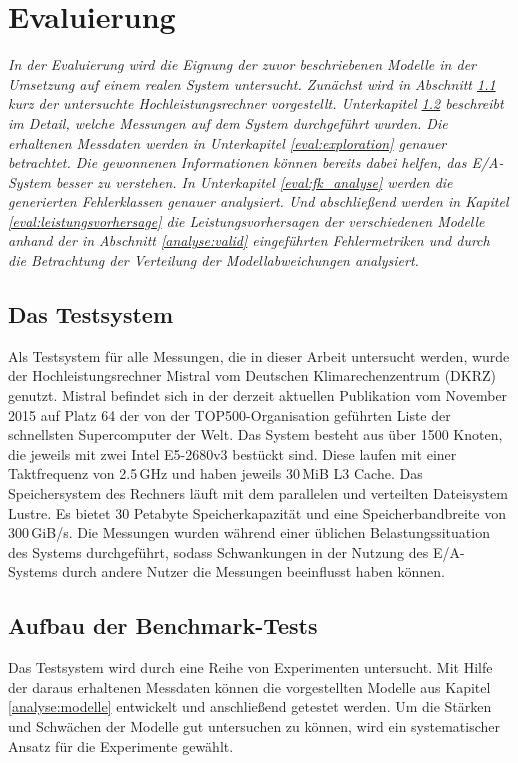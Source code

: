 \documentclass[
	12pt,
	a4paper,
	BCOR10mm,
	DIV14,
	listof=totoc,
	bibliography=totoc,
	headsepline
]{scrreprt}
\begin{document}
\chapter{Evaluierung}
\label{eval}
\textit{%
	In der Evaluierung wird die Eignung der zuvor beschriebenen Modelle in der Umsetzung auf einem realen System untersucht.
	Zunächst wird in Abschnitt \ref{eval:testsystem} kurz der untersuchte Hochleistungsrechner vorgestellt.	
	Unterkapitel \ref{eval:benchmark} beschreibt im Detail, welche Messungen auf dem System durchgeführt wurden.
	Die erhaltenen Messdaten werden in Unterkapitel \ref{eval:exploration} genauer betrachtet. Die gewonnenen Informationen können bereits dabei helfen, das E/A-System besser zu verstehen.
	In Unterkapitel \ref{eval:fk_analyse} werden die generierten Fehlerklassen genauer analysiert.
	Und abschließend werden in Kapitel \ref{eval:leistungsvorhersage} die Leistungsvorhersagen der verschiedenen Modelle anhand der in Abschnitt \ref{analyse:valid} eingeführten Fehlermetriken und durch die Betrachtung der Verteilung der Modellabweichungen analysiert.
}
\bigskip

\section{Das Testsystem}
\label{eval:testsystem}
Als Testsystem für alle Messungen, die in dieser Arbeit untersucht werden, wurde der Hochleistungsrechner Mistral vom Deutschen Klimarechenzentrum (DKRZ) genutzt.
Mistral befindet sich in der derzeit aktuellen Publikation vom November 2015 auf Platz 64 der von der TOP500-Organisation geführten Liste der schnellsten Supercomputer der Welt.
Das System besteht aus über 1500 Knoten, die jeweils mit zwei Intel E5-2680v3 bestückt sind. Diese laufen mit einer Taktfrequenz von 2.5\,GHz und haben jeweils 30\,MiB L3 Cache.
Das Speichersystem des Rechners läuft mit dem parallelen und verteilten Dateisystem Lustre.
Es bietet 30 Petabyte Speicherkapazität und eine Speicherbandbreite von 300\,GiB/s. Die Messungen wurden während einer üblichen Belastungssituation des Systems durchgeführt, sodass Schwankungen in der Nutzung des E/A-Systems durch andere Nutzer die Messungen beeinflusst haben können.

\section{Aufbau der Benchmark-Tests}
\label{eval:benchmark}
Das Testsystem wird durch eine Reihe von Experimenten untersucht.
Mit Hilfe der daraus erhaltenen Messdaten können die vorgestellten Modelle aus Kapitel \ref{analyse:modelle} entwickelt und anschließend getestet werden.
Um die Stärken und Schwächen der Modelle gut untersuchen zu können, wird ein systematischer Ansatz für die Experimente gewählt.\medskip
\end{document}
